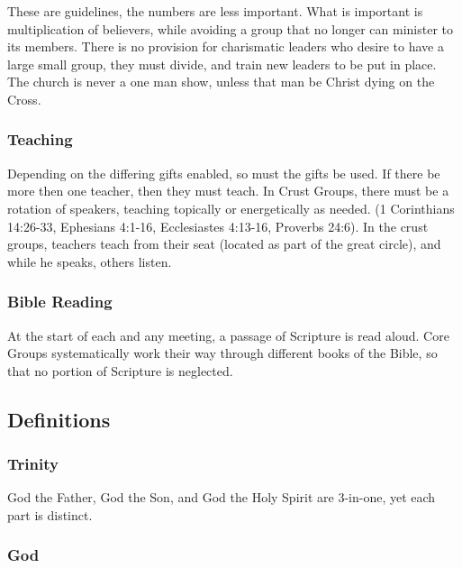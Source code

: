 These are guidelines, the numbers are less important. What is important is multiplication of believers, while avoiding a group that no longer can minister to its members. There is no provision for charismatic leaders who desire to have a large small group, they must divide, and train new leaders to be put in place. The church is never a one man show, unless that man be Christ dying on the Cross.



\subsubsection{Teaching}

Depending on the differing gifts enabled, so must the gifts be used. If there be more then one teacher, then they must teach. In Crust Groups, there must be a rotation of speakers, teaching topically or energetically as needed. (1 Corinthians 14:26-33, Ephesians 4:1-16, Ecclesiastes 4:13-16, Proverbs 24:6). In the crust groups, teachers teach from their seat (located as part of the great circle), and while he speaks, others listen.



\subsubsection{Bible Reading}

At the start of each and any meeting, a passage of Scripture is read aloud. Core Groups systematically work their way through different books of the Bible, so that no portion of Scripture is neglected.



\subsection{Definitions}



\subsubsection{Trinity}

God the Father, God the Son, and God the Holy Spirit are 3-in-one, yet each part is distinct.



\subsubsection{God}

